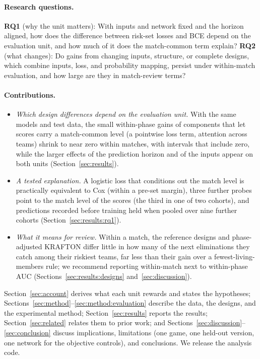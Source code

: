 \documentclass[sigconf,anonymous]{acmart}
\begin{document}
\paragraph{Research questions.}
\textbf{RQ1} (why the unit matters): With inputs and network fixed and the horizon aligned, how does the difference between risk-set losses and BCE depend on the evaluation unit, and how much of it does the match-common term explain?
\textbf{RQ2} (what changes): Do gains from changing inputs, structure, or complete designs, which combine inputs, loss, and probability mapping, persist under within-match evaluation, and how large are they in match-review terms?

\paragraph{Contributions.}
\begin{itemize}
\item \emph{Which design differences depend on the evaluation unit.} With the same models and test data, the small within-phase gains of components that let scores carry a match-common level (a pointwise loss term, attention across teams) shrink to near zero within matches, with intervals that include zero, while the larger effects of the prediction horizon and of the inputs appear on both units (Section~\ref{sec:results}).
\item \emph{A tested explanation.} A logistic loss that conditions out the match level is practically equivalent to Cox (within a pre-set margin), three further probes point to the match level of the scores (the third in one of two cohorts), and predictions recorded before training held when pooled over nine further cohorts (Section~\ref{sec:results:rq1}).
\item \emph{What it means for review.} Within a match, the reference designs and phase-adjusted KRAFTON differ little in how many of the next eliminations they catch among their riskiest teams, far less than their gain over a fewest-living-members rule; we recommend reporting within-match next to within-phase AUC (Sections~\ref{sec:results:designs} and~\ref{sec:discussion}).
\end{itemize}
Section~\ref{sec:account} derives what each unit rewards and states the hypotheses; Sections~\ref{sec:method}--\ref{sec:method:evaluation} describe the data, the designs, and the experimental method; Section~\ref{sec:results} reports the results; Section~\ref{sec:related} relates them to prior work; and Sections~\ref{sec:discussion}--\ref{sec:conclusion} discuss implications, limitations (one game, one held-out version, one network for the objective controls), and conclusions. We release the analysis code.
\end{document}

